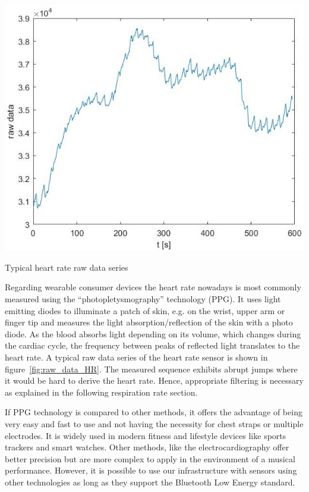 \documentclass{sigchi-ext}
\begin{document}
\begin{marginfigure}[-10pc]
  \begin{minipage}{\marginparwidth}
    \centering
    \includegraphics[width=\marginparwidth]{figures/raw_data_heartrate}
    \caption{Typical heart rate raw data series}
    \label{fig:raw_data_HR}
  \end{minipage}
\end{marginfigure}

Regarding wearable consumer devices the heart rate nowadays is most commonly measured using the ``photopletysmography'' technology 
(PPG). It uses light emitting diodes to illuminate a patch of skin, e.g. on the wrist, upper arm
or finger tip and measures the light absorption/reflection of the skin with a photo diode. As the blood absorbs light depending on
its volume, which changes during the cardiac cycle, the frequency between peaks of reflected light translates to the heart rate.
A typical raw data series of the heart rate sensor is shown in figure~\ref{fig:raw_data_HR}. The measured sequence exhibits abrupt 
jumps where it would be hard to derive the heart rate. Hence, appropriate filtering is necessary as explained in the following 
respiration rate section.

If PPG technology is compared to other methods, it offers the advantage of being very easy and fast
to use and not having the necessity for chest straps or multiple electrodes. It is widely used
in modern fitness and lifestyle devices like sports trackers and smart watches. Other methods,
like the electrocardiography offer better precision but are more complex to apply in the
environment of a musical performance. However, it is possible to use our infrastructure with sensors using other technologies
as long as they support the Bluetooth Low Energy standard.
\end{document}
